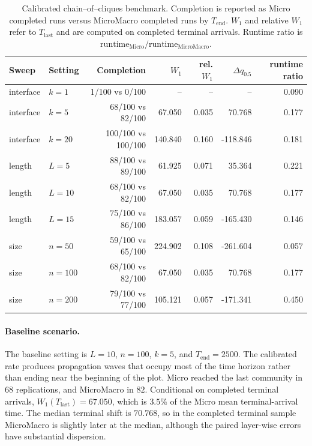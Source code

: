 \documentclass[12pt]{article}
\begin{document}
\begin{table}[t]
    \centering
    \begin{tabular}{llrrrrr}
        \hline
        Sweep & Setting & Completion & \(W_1\) & rel. \(W_1\) & \(\Delta q_{0.5}\) & runtime ratio \\
        \hline
        interface & \(k=1\)  & 1/100 vs 0/100     & --     & --    & --       & 0.090 \\
        interface & \(k=5\)  & 68/100 vs 82/100   & 67.050 & 0.035 & 70.768   & 0.177 \\
        interface & \(k=20\) & 100/100 vs 100/100 & 140.840 & 0.160 & -118.846 & 0.181 \\
        length & \(L=5\)    & 88/100 vs 89/100   & 61.925 & 0.071 & 35.364   & 0.221 \\
        length & \(L=10\)   & 68/100 vs 82/100   & 67.050 & 0.035 & 70.768   & 0.177 \\
        length & \(L=15\)   & 75/100 vs 86/100   & 183.057 & 0.059 & -165.430 & 0.146 \\
        size & \(n=50\)     & 59/100 vs 65/100   & 224.902 & 0.108 & -261.604 & 0.057 \\
        size & \(n=100\)    & 68/100 vs 82/100   & 67.050 & 0.035 & 70.768   & 0.177 \\
        size & \(n=200\)    & 79/100 vs 77/100   & 105.121 & 0.057 & -171.341 & 0.450 \\
        \hline
    \end{tabular}
    \caption{Calibrated chain--of--cliques benchmark. Completion is reported as Micro completed runs versus MicroMacro completed runs by \(T_{\mathrm{end}}\). \(W_1\) and relative \(W_1\) refer to \(T_{\mathrm{last}}\) and are computed on completed terminal arrivals. Runtime ratio is \(\mathrm{runtime}_{\mathrm{Micro}}/\mathrm{runtime}_{\mathrm{MicroMacro}}\).}
    \label{tab:chain_cliques_v2_summary}
\end{table}

\paragraph{Baseline scenario.}
The baseline setting is \(L=10\), \(n=100\), \(k=5\), and \(T_{\mathrm{end}}=2500\). The calibrated rate produces propagation waves that occupy most of the time horizon rather than ending near the beginning of the plot. Micro reached the last community in \(68\) replications, and MicroMacro in \(82\). Conditional on completed terminal arrivals, \(W_1(T_{\mathrm{last}})=67.050\), which is \(3.5\%\) of the Micro mean terminal-arrival time. The median terminal shift is \(70.768\), so in the completed terminal sample MicroMacro is slightly later at the median, although the paired layer-wise errors have substantial dispersion.
\end{document}
